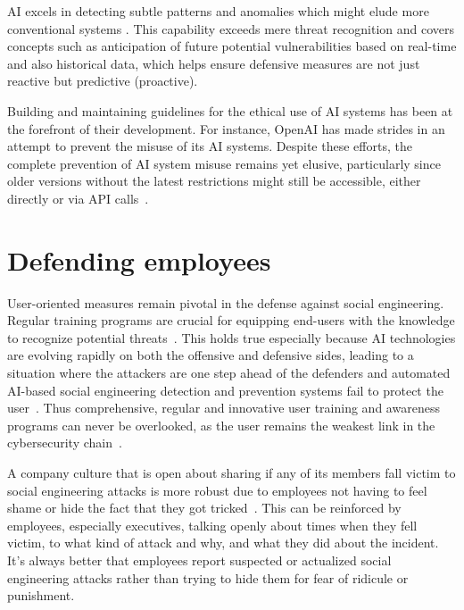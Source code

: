 AI excels in detecting subtle patterns and anomalies which might elude more conventional systems \citep{fakhouri_AI_Driven_Solutions_SE_Attacks_2024}. This capability exceeds mere threat recognition and covers concepts such as anticipation of future potential vulnerabilities based on real-time and also historical data, which helps ensure defensive measures are not just reactive but predictive (proactive).


Building and maintaining guidelines for the ethical use of AI systems has been at the forefront of their development. For instance, OpenAI has made strides in an attempt to prevent the misuse of its AI systems. Despite these efforts, the complete prevention of AI system misuse remains yet elusive, particularly since older versions without the latest restrictions might still be accessible, either directly or via API calls~\citep{gupta_From_ChatGPT_to_ThreatGPT_2023}.

\section{Defending employees}
\begin{comment}
\end{comment}

User-oriented measures remain pivotal in the defense against social engineering. Regular training programs are crucial for equipping end-users with the knowledge to recognize potential threats~\citep{hadnagy_Social_Engineering_The_Science_2018}. This holds true especially because AI technologies are evolving rapidly on both the offensive and defensive sides, leading to a situation where the attackers are one step ahead of the defenders and automated AI-based social engineering detection and prevention systems fail to protect the user~\citep{fakhouri_AI_Driven_Solutions_SE_Attacks_2024}. Thus comprehensive, regular and innovative user training and awareness programs can never be overlooked, as the user remains the weakest link in the cybersecurity chain~\citep{mitnick_The_Art_of_Deception_2003}.

A company culture that is open about sharing if any of its members fall victim to social engineering attacks is more robust due to employees not having to feel shame or hide the fact that they got tricked~\citep{hadnagy_Social_Engineering_The_Science_2018}. This can be reinforced by employees, especially executives, talking openly about times when they fell victim, to what kind of attack and why, and what they did about the incident. It's always better that employees report suspected or actualized social engineering attacks rather than trying to hide them for fear of ridicule or punishment.


